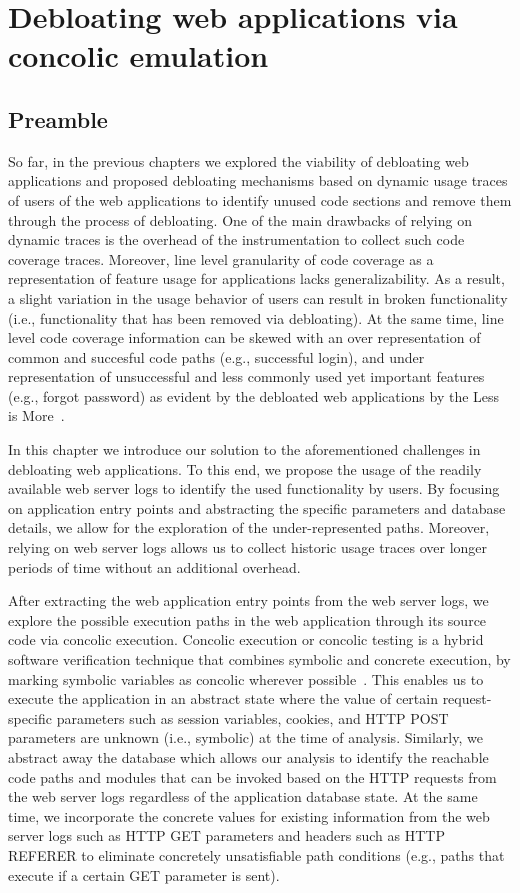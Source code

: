 \chapter{Debloating web applications via concolic emulation}

\section*{Preamble}

So far, in the previous chapters we explored the viability of debloating web applications and proposed debloating mechanisms based on dynamic usage traces of users of the web applications to identify unused code sections and remove them through the process of debloating. 
One of the main drawbacks of relying on dynamic traces is the overhead of the instrumentation to collect such code coverage traces. 
Moreover, line level granularity of code coverage as a representation of feature usage for applications lacks generalizability. 
As a result, a slight variation in the usage behavior of users can result in broken functionality (i.e., functionality that has been removed via debloating). 
At the same time, line level code coverage information can be skewed with an over representation of common and succesful code paths (e.g., successful login), and under representation of unsuccessful and less commonly used yet important features (e.g., forgot password) as evident by the debloated web applications by the Less is More~\cite{azad2019less}.

In this chapter we introduce our solution to the aforementioned challenges in debloating web applications. 
To this end, we propose the usage of the readily available web server logs to identify the used functionality by users. 
By focusing on application entry points and abstracting the specific parameters and database details, we allow for the exploration of the under-represented paths. 
Moreover, relying on web server logs allows us to collect historic usage traces over longer periods of time without an additional overhead.

After extracting the web application entry points from the web server logs, we explore the possible execution paths in the web application through its source code via concolic execution. 
Concolic execution or concolic testing is a hybrid software verification technique that combines symbolic and concrete execution, by marking symbolic variables as concolic wherever possible~\cite{sen2007concolic}.  
This enables us to execute the application in an abstract state where the value of certain request-specific parameters such as session variables, cookies, and HTTP POST parameters are unknown (i.e., symbolic) at the time of analysis. 
Similarly, we abstract away the database which allows our analysis to identify the reachable code paths and modules that can be invoked based on the HTTP requests from the web server logs regardless of the application database state. 
At the same time, we incorporate the concrete values for existing information from the web server logs such as HTTP GET parameters and headers such as HTTP REFERER to eliminate concretely unsatisfiable path conditions (e.g., paths that execute if a certain GET parameter is sent). 

